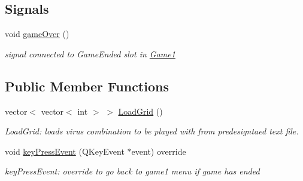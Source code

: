 \subsection*{Signals}
\begin{DoxyCompactItemize}
\item 
\mbox{\label{classGame1Grid_ae12a5e01c80683d7d8f3187d8b560a8c}} 
void \hyperlink{classGame1Grid_ae12a5e01c80683d7d8f3187d8b560a8c}{game\+Over} ()
\begin{DoxyCompactList}\small\item\em signal connected to Game\+Ended slot in \hyperlink{classGame1}{Game1} \end{DoxyCompactList}\end{DoxyCompactItemize}
\subsection*{Public Member Functions}
\begin{DoxyCompactItemize}
\item 
vector$<$ vector$<$ int $>$ $>$ \hyperlink{classGame1Grid_a019f169cfa7cb777887ec2e8773c7e17}{Load\+Grid} ()
\begin{DoxyCompactList}\small\item\em Load\+Grid\+: loads virus combination to be played with from predesigntaed text file. \end{DoxyCompactList}\item 
void \hyperlink{classGame1Grid_af0ee0c96e8995ce18eddecafca1fdcfc}{key\+Press\+Event} (Q\+Key\+Event $\ast$event) override
\begin{DoxyCompactList}\small\item\em key\+Press\+Event\+: override to go back to game1 menu if game has ended \end{DoxyCompactList}\end{DoxyCompactItemize}
